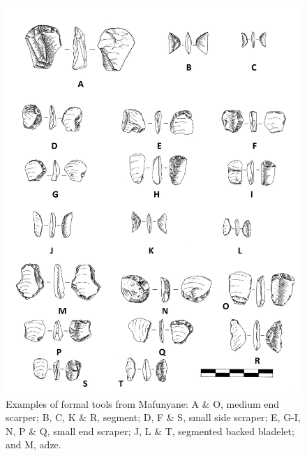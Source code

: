 \documentclass{ijsra}
\begin{document}
	\begin{figure} %
		\includegraphics[width=\linewidth]{figures/Forssman-Figure05}
		\caption{Examples of formal tools from Mafunyane: A \& O, medium end scarper; B, C, K \& R, segment; D, F \& S, small side scraper; E, G-I, N, P \& Q, small end scraper; J, L \& T, segmented backed bladelet; and M, adze.}
		\label{fig:Forssman-Figure05}
	\end{figure}
	
\end{document}
